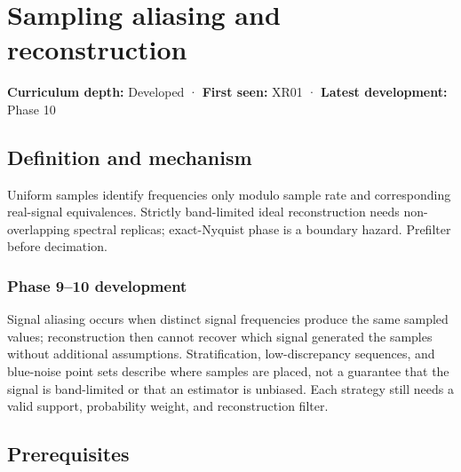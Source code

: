 \hypertarget{appendix-6a7869dd79a6}{}\label{referencestart:appendix-6a7869dd79a6}
\section{Sampling aliasing and reconstruction}\label{appendix-6a7869dd79a6-sampling-aliasing-and-reconstruction}

\hypertarget{appendix-6a7869dd79a6-sampling-aliasing-and-reconstruction}{}

\textbf{Curriculum depth:} Developed · \textbf{First seen:} XR01 · \textbf{Latest development:} Phase 10

\begin{allmightroledefinition}

\subsection{Definition and mechanism}\label{appendix-6a7869dd79a6-definition-and-mechanism}

\hypertarget{appendix-6a7869dd79a6-definition-and-mechanism}{}

Uniform samples identify frequencies only modulo sample rate and corresponding real-signal equivalences. Strictly band-limited ideal reconstruction needs non-overlapping spectral replicas; exact-Nyquist phase is a boundary hazard. Prefilter before decimation.

\end{allmightroledefinition}

\subsubsection{Phase 9--10 development}\label{appendix-6a7869dd79a6-phase-910-development}

\hypertarget{appendix-6a7869dd79a6-phase-910-development}{}

Signal aliasing occurs when distinct signal frequencies produce the same sampled values; reconstruction then cannot recover which signal generated the samples without additional assumptions. Stratification, low-discrepancy sequences, and blue-noise point sets describe where samples are placed, not a guarantee that the signal is band-limited or that an estimator is unbiased. Each strategy still needs a valid support, probability weight, and reconstruction filter.

\subsection{Prerequisites}\label{appendix-6a7869dd79a6-prerequisites}

